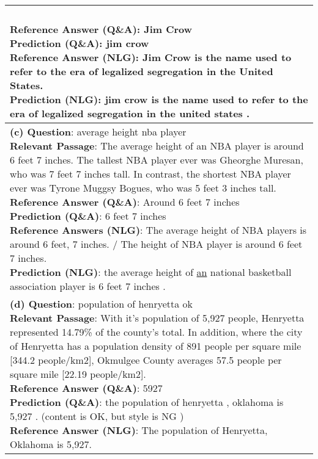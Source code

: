 \documentclass[11pt,a4paper]{article}
\newcommand{\cmark}{\ding{51}}%
\newcommand{\xmark}{\ding{55}}%
\theoremstyle{mydef}
\theoremstyle{myprob}
\begin{document}
\begin{table*}[h!]
{\begin{tabular}{p{50em}}
{\\
\textbf{Reference Answer (Q\&A)}: Jim Crow \\
\textbf{Prediction (Q\&A)}: jim crow \cmark \\
\textbf{Reference Answer (NLG)}: Jim Crow is the name used to refer to the era of legalized segregation in the United States. \\
\textbf{Prediction (NLG)}: jim crow is the name used to refer to the era of legalized segregation in the united states . \cmark
}
\vspace{1pt}
\\ \hline
\vspace{0.5pt}
\pbox{50em}{
\textbf{(c) Question}: average height nba player\\
\textbf{Relevant Passage}: The average height of an NBA player is around 6 feet 7 inches. The tallest NBA player ever was Gheorghe Muresan, who was 7 feet 7 inches tall. In contrast, the shortest NBA player ever was Tyrone Muggsy Bogues, who was 5 feet 3 inches tall. \\
\textbf{Reference Answer (Q\&A)}: Around 6 feet 7 inches \\
\textbf{Prediction (Q\&A)}: 6 feet 7 inches	\cmark \\
\textbf{Reference Answers (NLG)}: The average height of NBA players is around 6 feet, 7 inches. / The height of NBA player is around 6 feet 7 inches.\\
\textbf{Prediction (NLG)}: the average height of \underline{an} national basketball association player is 6 feet 7 inches . \cmark
}
\vspace{1pt}
\\ \hline 
\vspace{0.5pt}
\pbox{50em}{
\textbf{(d) Question}: population of henryetta ok\\
\textbf{Relevant Passage}: With it's population of 5,927 people, Henryetta represented 14.79\% of the county's total. In addition, where the city of Henryetta has a population density of 891 people per square mile [344.2 people/km2], Okmulgee County averages 57.5 people per square mile [22.19 people/km2].\\
\textbf{Reference Answer (Q\&A)}: 5927 \\
\textbf{Prediction (Q\&A)}: the population of henryetta , oklahoma is 5,927 .   \cmark \hspace{.5em} (content is OK, but style is NG \xmark)\\
\textbf{Reference Answer (NLG)}: The population of Henryetta, Oklahoma is 5,927. \\
}
\end{tabular}}
\end{table*}
\end{document}
